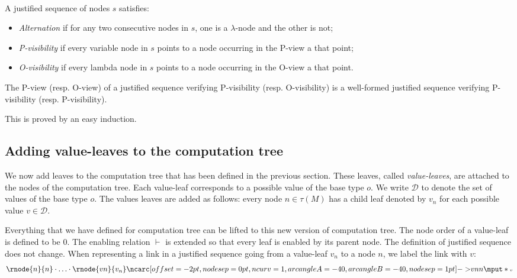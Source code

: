 \begin{dfn} \ \\
A justified sequence of nodes $s$ satisfies:
\begin{itemize}
\item \emph{Alternation} if for any two consecutive nodes in $s$, one is a $\lambda$-node
and the other is not;

\item \emph{P-visibility} if every variable node in $s$ points to a node occurring in the P-view a that point;

\item  \emph{O-visibility} if every lambda node in $s$ points to a node occurring in the O-view a that point.
\end{itemize}
\end{dfn}

\begin{property}
\label{proper:pview_visibility}
The P-view (resp. O-view) of a justified sequence verifying P-visibility (resp. O-visibility)
is a well-formed justified sequence verifying P-visibility (resp. P-visibility).
\end{property}
This is proved by an easy induction.

\subsection{Adding value-leaves to the computation tree}
\label{sec:adding_value_leaves}

We now add leaves to the computation tree that has been defined in the previous section.
These leaves, called \emph{value-leaves}, are attached to the nodes of the computation tree. Each
value-leaf corresponds to a possible value of the base type $o$.
We write $\mathcal{D}$ to denote the set of values of the base type
$o$. The values leaves are added as follows: every  %
node $n \in \tau(M)$ has a child leaf denoted by $v_n$ for each possible value $v \in \mathcal{D}$.



Everything that we have defined for computation tree can be lifted
to this new version of computation tree. The node order of a
value-leaf is defined to be $0$. The enabling relation $\vdash$ is
extended so that every leaf is enabled by its parent node. The
definition of justified sequence does not change.
When representing a link in a justified sequence going from a value-leaf $v_n$ to a node $n$,
we label the link with $v$:
$$
\rnode{n}{n} \cdot \ldots \cdot \rnode{vn}{v_n} \link[nodesep=1pt]{40}{vn}{n} \lnklabel{v}
$$


